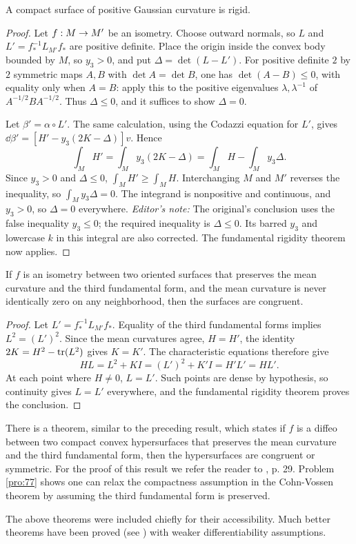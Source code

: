 \documentclass[../main]{subfiles}
\begin{document}
\begin{theorem} \label{thm:ch8.5.2}
\label{thm:stuff}
A compact surface of positive Gaussian curvature is rigid.
\end{theorem}

\begin{proof}
Let $f:M\to M'$ be an isometry. Choose outward normals, so $L$ and $L'=f_\ast^{-1}L_{M'}f_\ast$ are positive definite. Place the origin inside the convex body bounded by $M$, so $y_3>0$, and put $\Delta=\det(L-L')$. For positive definite $2$ by $2$ symmetric maps $A,B$ with $\det A=\det B$, one has $\det(A-B)\leq0$, with equality only when $A=B$: apply this to the positive eigenvalues $\lambda,\lambda^{-1}$ of $A^{-1/2}BA^{-1/2}$. Thus $\Delta\leq0$, and it suffices to show $\Delta=0$.

Let $\beta'=\alpha\circ L'$. The same calculation, using the Codazzi equation for $L'$, gives $\dd\beta'=[H'-y_3(2K-\Delta)]v$. Hence
\[\int_MH'=\int_My_3(2K-\Delta)=\int_MH-\int_My_3\Delta.\]
Since $y_3>0$ and $\Delta\leq0$, $\int_MH'\geq\int_MH$. Interchanging $M$ and $M'$ reverses the inequality, so $\int_My_3\Delta=0$. The integrand is nonpositive and continuous, and $y_3>0$, so $\Delta=0$ everywhere. \emph{Editor's note:} The original's conclusion uses the false inequality $y_3\leq0$; the required inequality is $\Delta\leq0$. Its barred $y_3$ and lowercase $k$ in this integral are also corrected. The fundamental rigidity theorem now applies.
\end{proof}



\begin{theorem} \label{thm:ch8.5.3}
If $f$ is an isometry between two oriented surfaces that preserves the mean curvature and the third fundamental form, and the mean curvature is never identically zero on any neighborhood, then the surfaces are congruent.
\end{theorem}

\begin{proof}
Let $L'=f_\ast^{-1}L_{M'}f_\ast$. Equality of the third fundamental forms implies $L^2=(L')^2$. Since the mean curvatures agree, $H=H'$, the identity $2K=H^2-\mathrm{tr}(L^2)$ gives $K=K'$. The characteristic equations therefore give
\[HL=L^2+KI=(L')^2+K'I=H'L'=HL'.\]
At each point where $H\neq0$, $L=L'$. Such points are dense by hypothesis, so continuity gives $L=L'$ everywhere, and the fundamental rigidity theorem proves the conclusion.
\end{proof}



There is a theorem, similar to the preceding result, which states if $f$ is a diffeo between two compact convex hypersurfaces that preserves the mean curvature and the third fundamental form, then the hypersurfaces are congruent or symmetric. For the proof of this result we refer the reader to \cite{chern1951topics}, p. 29. Problem \ref{pro:77} shows one can relax the compactness assumption in the Cohn-Vossen theorem by assuming the third fundamental form is preserved.

The above theorems were included chiefly for their accessibility. Much better theorems have been proved (see \cite{poggorelov1956a}) with weaker differentiability assumptions.
\end{document}
